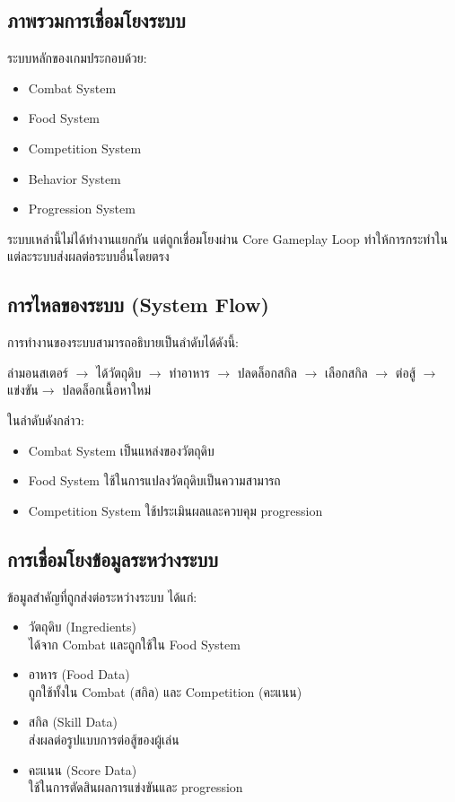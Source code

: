 \subsection{ภาพรวมการเชื่อมโยงระบบ}

ระบบหลักของเกมประกอบด้วย:
\begin{itemize}
    \item Combat System
    \item Food System
    \item Competition System
    \item Behavior System
    \item Progression System
\end{itemize}

ระบบเหล่านี้ไม่ได้ทำงานแยกกัน แต่ถูกเชื่อมโยงผ่าน Core Gameplay Loop ทำให้การกระทำในแต่ละระบบส่งผลต่อระบบอื่นโดยตรง

\subsection{การไหลของระบบ (System Flow)}

การทำงานของระบบสามารถอธิบายเป็นลำดับได้ดังนี้:
\par\vspace{0.5em}\noindent
ล่ามอนสเตอร์ $\rightarrow$ ได้วัตถุดิบ $\rightarrow$ ทำอาหาร $\rightarrow$ ปลดล็อกสกิล $\rightarrow$ เลือกสกิล $\rightarrow$ ต่อสู้ $\rightarrow$ แข่งขัน$\rightarrow$ ปลดล็อกเนื้อหาใหม่

ในลำดับดังกล่าว:
\begin{itemize}
    \item Combat System เป็นแหล่งของวัตถุดิบ
    \item Food System ใช้ในการแปลงวัตถุดิบเป็นความสามารถ
    \item Competition System ใช้ประเมินผลและควบคุม progression
\end{itemize}

\subsection{การเชื่อมโยงข้อมูลระหว่างระบบ}

ข้อมูลสำคัญที่ถูกส่งต่อระหว่างระบบ ได้แก่:
\begin{itemize}
    \item วัตถุดิบ (Ingredients) \\
    ได้จาก Combat และถูกใช้ใน Food System
    \item อาหาร (Food Data) \\
    ถูกใช้ทั้งใน Combat (สกิล) และ Competition (คะแนน)
    \item สกิล (Skill Data) \\
    ส่งผลต่อรูปแบบการต่อสู้ของผู้เล่น
    \item คะแนน (Score Data) \\
    ใช้ในการตัดสินผลการแข่งขันและ progression
\end{itemize}

